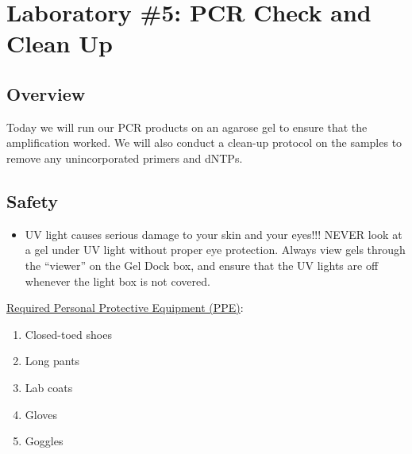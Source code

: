 \documentclass[12pt, hidelinks]{article}
\begin{document}
\newpage
\section{Laboratory \#5: PCR Check and Clean Up}


	\subsection{Overview}
	Today we will run our PCR products on an agarose gel to ensure that the amplification worked. We will also conduct a clean-up protocol on the samples to remove any unincorporated primers and dNTPs.
	
	
	\subsection{Safety}
		\begin{itemize}
			\item UV light causes serious damage to your skin and your eyes!!!  NEVER look at a gel under UV light without proper eye protection. Always view gels through the ``viewer'' on the Gel Dock box, and ensure that the UV lights are off whenever the light box is not covered.
		\end{itemize}

	\underline{Required Personal Protective Equipment (PPE)}:
		\begin{enumerate}
			\item Closed-toed shoes
			\item Long pants
			\item Lab coats
			\item Gloves
			\item Goggles
		\end{enumerate}	
			
	
\end{document}
